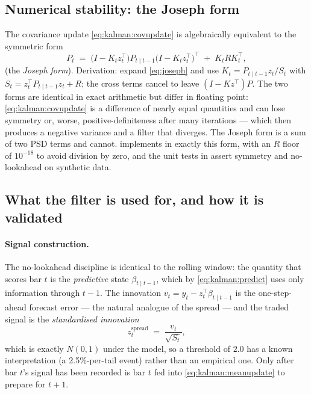 \subsection{Numerical stability: the Joseph form}
\label{sec:kalman:joseph}

The covariance update \eqref{eq:kalman:covupdate} is algebraically equivalent to the
symmetric form
\begin{equation}
  P_t \;=\; \bigl(I-K_tz_t^{\top}\bigr)P_{t\mid t-1}\bigl(I-K_tz_t^{\top}\bigr)^{\top}
  \;+\; K_t R K_t^{\top},
  \label{eq:joseph}
\end{equation}
(the \emph{Joseph form}). Derivation: expand \eqref{eq:joseph} and use
$K_t = P_{t\mid t-1}z_t/S_t$ with $S_t=z_t^{\top}P_{t\mid t-1}z_t+R$; the cross terms
cancel to leave $(I-Kz^{\top})P$. The two forms are identical in exact arithmetic but
differ in floating point: \eqref{eq:kalman:covupdate} is a difference of nearly equal
quantities and can lose symmetry or, worse, positive-definiteness after many
iterations --- which then produces a negative variance and a filter that diverges. The
Joseph form is a sum of two PSD terms and cannot. 
implements  in exactly this form, with an $R$ floor of
$10^{-18}$ to avoid division by zero, and the unit tests in
 assert symmetry and no-lookahead on synthetic data.

\subsection{What the filter is used for, and how it is validated}
\label{sec:kalman:usage}

\paragraph{Signal construction.} The no-lookahead discipline is identical to the rolling
window: the quantity that scores bar $t$ is the \emph{predictive} state
$\beta_{t\mid t-1}$, which by \eqref{eq:kalman:predict} uses only information through
$t-1$. The innovation $v_t=y_t-z_t^{\top}\beta_{t\mid t-1}$ is the one-step-ahead
forecast error --- the natural analogue of the spread --- and the traded signal is the
\emph{standardised innovation}
\begin{equation}
  z^{\text{spread}}_t \;=\; \frac{v_t}{\sqrt{S_t}} ,
  \label{eq:kalman:signal}
\end{equation}
which is exactly $N(0,1)$ under the model, so a threshold of $2.0$ has a known
interpretation (a 2.5\%-per-tail event) rather than an empirical one. Only after bar
$t$'s signal has been recorded is bar $t$ fed into \eqref{eq:kalman:meanupdate} to
prepare for $t+1$.

